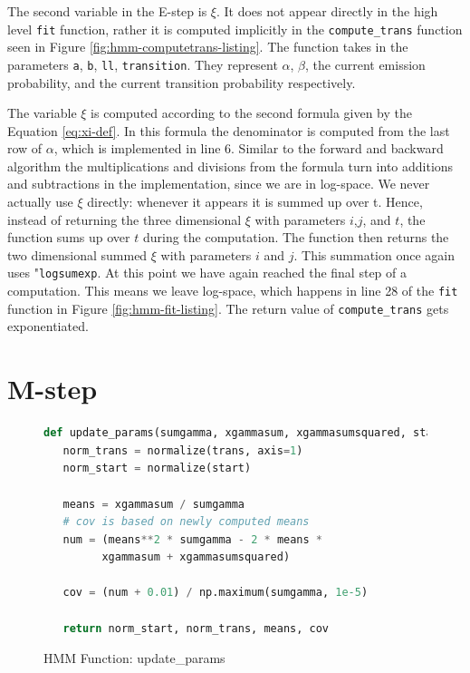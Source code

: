 The second variable in the E-step is $\xi$. It does not appear directly in the high level \texttt{fit} function, rather it is computed implicitly in the \texttt{compute\_trans} function seen in Figure \ref{fig:hmm-computetrans-listing}. The function takes in the parameters \texttt{a}, \texttt{b}, \texttt{ll}, \texttt{transition}. They represent $\alpha$, $\beta$, the current emission probability, and the current transition probability respectively. 

The variable $\xi$ is computed according to the second formula given by the Equation \eqref{eq:xi-def}. In this formula the denominator is computed from the last row of $\alpha$, which is implemented in line 6. Similar to the forward and backward algorithm the multiplications and divisions from the formula turn into additions and subtractions in the implementation, since we are in log-space. 
We never actually use $\xi$ directly: whenever it appears it is summed up over t. Hence, instead of returning the three dimensional $\xi$ with parameters $i$,$j$, and $t$, the function sums up over $t$ during the computation. The function then returns the two dimensional summed $\xi$ with parameters $i$ and $j$. This summation once again uses "\texttt{logsumexp}. At this point we have again reached the final step of a computation. This means we leave log-space, which happens in line 28 of the \texttt{fit} function in Figure \ref{fig:hmm-fit-listing}. The return value of \texttt{compute\_trans} gets exponentiated. 

\section{M-step}

\begin{figure}
\begin{singlespace}
\begin{lstlisting}[language=Python]
def update_params(sumgamma, xgammasum, xgammasumsquared, start, trans):
   norm_trans = normalize(trans, axis=1)
   norm_start = normalize(start)

   means = xgammasum / sumgamma
   # cov is based on newly computed means
   num = (means**2 * sumgamma - 2 * means *
         xgammasum + xgammasumsquared)

   cov = (num + 0.01) / np.maximum(sumgamma, 1e-5)

   return norm_start, norm_trans, means, cov
\end{lstlisting}
\end{singlespace}
\caption{HMM Function: update\_params}    
\label{fig:hmm-updateparams-listing}
\end{figure}

